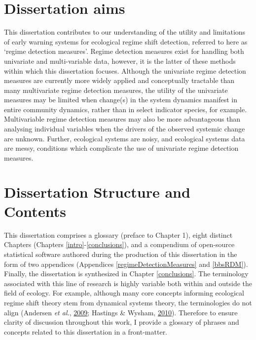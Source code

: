 \documentclass[12pt,twoside,openany]{reedthesis}
\begin{document}
\hypertarget{dissertation-aims}{%
\section{Dissertation aims}\label{dissertation-aims}}

This dissertation contributes to our understanding of the utility and limitations of early warning systems for ecological regime shift detection, referred to here as `regime detection measures'. Regime detection measures exist for handling both univariate and multi-variable data, however, it is the latter of these methods within which this dissertation focuses. Although the univariate regime detection measures are currently more widely applied and conceptually tractable than many multivariate regime detection measures, the utility of the univariate measures may be limited when change(s) in the system dynamics manifest in entire community dynamics, rather than in select indicator species, for example. Multivariable regime detection measures may also be more advantageous than analysing individual variables when the drivers of the observed systemic change are unknown. Further, ecological systems are noisy, and ecological systems data are messy, conditions which complicate the use of univariate regime detection measures.

\hypertarget{dissertation-structure-and-contents}{%
\section{Dissertation Structure and Contents}\label{dissertation-structure-and-contents}}

This dissertation comprises a glossary (preface to Chapter 1), eight distinct Chapters (Chapters \ref{intro}-\ref{conclusions}), and a compendium of open-source statistical software authored during the production of this dissertation in the form of two appendices (Appendices \ref{regimeDetectionMeasures} and \ref{bbsRDM}). Finally, the dissertation is synthesized in Chapter \ref{conclusions}. The terminology associated with this line of research is highly variable both within and outside the field of ecology. For example, although many core concepts informing ecological regime shift theory stem from dynamical systems theory, the terminologies do not align (Andersen \emph{et al.}, \protect\hyperlink{ref-andersen_ecological_2009}{2009}; Hastings \& Wysham, \protect\hyperlink{ref-hastings2010regime}{2010}). Therefore to ensure clarity of discussion throughout this work, I provide a glossary of phrases and concepts related to this dissertation in a front-matter.
\end{document}
